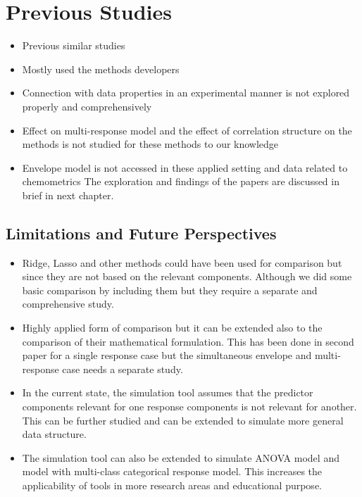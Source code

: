 \documentclass[11pt,twoside,openright,titlepage,
  headinclude,footinclude,BCOR=5mm,
  numbers=noenddot,cleardoublepage=empty,
  tablecaptionabove, dottedtoc,
  bibliography=totoc]{scrreprt}
\providecommand{\tightlist}{%
  \setlength{\itemsep}{0pt}\setlength{\parskip}{0pt}}
\begin{document}
\hypertarget{previous-studies}{%
\chapter{Previous Studies}\label{previous-studies}}

\begin{itemize}
\tightlist
\item
  Previous similar studies
\item
  Mostly used the methods developers
\item
  Connection with data properties in an experimental manner is not explored properly and comprehensively
\item
  Effect on multi-response model and the effect of correlation structure on the methods is not studied for these methods to our knowledge
\item
  Envelope model is not accessed in these applied setting and data related to chemometrics
  The exploration and findings of the papers are discussed in brief in next chapter.
\end{itemize}

\hypertarget{limitations-and-future-perspectives}{%
\section{Limitations and Future Perspectives}\label{limitations-and-future-perspectives}}

\begin{itemize}
\tightlist
\item
  Ridge, Lasso and other methods could have been used for comparison but since they are not based on the relevant components. Although we did some basic comparison by including them but they require a separate and comprehensive study.
\item
  Highly applied form of comparison but it can be extended also to the comparison of their mathematical formulation. This has been done in second paper for a single response case but the simultaneous envelope and multi-response case needs a separate study.
\item
  In the current state, the simulation tool assumes that the predictor components relevant for one response components is not relevant for another. This can be further studied and can be extended to simulate more general data structure.
\item
  The simulation tool can also be extended to simulate ANOVA model and model with multi-class categorical response model. This increases the applicability of tools in more research areas and educational purpose.
\end{itemize}
\end{document}
